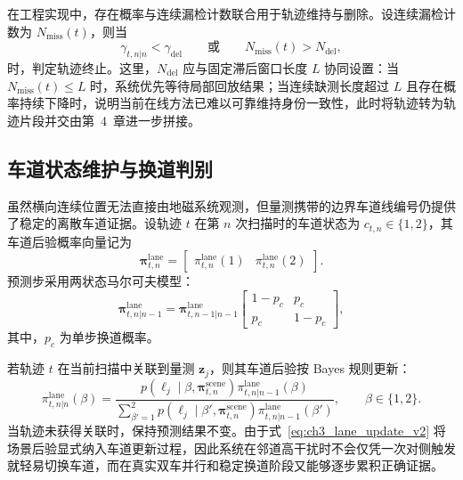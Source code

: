 \documentclass{xdupgthesis}
\begin{document}
在工程实现中，存在概率与连续漏检计数联合用于轨迹维持与删除。设连续漏检计数为 $N_{\mathrm{miss}}(t)$，则当
\begin{equation}
	\gamma_{t,n|n}<\gamma_{\mathrm{del}}
	\qquad\text{或}\qquad
	N_{\mathrm{miss}}(t)>N_{\mathrm{del}},
	\label{eq:ch3_delete_v2}
\end{equation}
时，判定轨迹终止。这里，$N_{\mathrm{del}}$ 应与固定滞后窗口长度 $L$ 协同设置：当 $N_{\mathrm{miss}}(t)\le L$ 时，系统优先等待局部回放结果；当连续缺测长度超过 $L$ 且存在概率持续下降时，说明当前在线方法已难以可靠维持身份一致性，此时将轨迹转为轨迹片段并交由第~4~章进一步拼接。

\subsection{车道状态维护与换道判别}

虽然横向连续位置无法直接由地磁系统观测，但量测携带的边界车道线编号仍提供了稳定的离散车道证据。设轨迹 $t$ 在第 $n$ 次扫描时的车道状态为 $c_{t,n}\in\{1,2\}$，其车道后验概率向量记为
\begin{equation}
	\boldsymbol\pi_{t,n}^{\mathrm{lane}}=
	\begin{bmatrix}
		\pi_{t,n}^{\mathrm{lane}}(1) &
		\pi_{t,n}^{\mathrm{lane}}(2)
	\end{bmatrix}.
	\label{eq:ch3_lane_vector_v2}
\end{equation}
预测步采用两状态马尔可夫模型：
\begin{equation}
	\boldsymbol\pi_{t,n|n-1}^{\mathrm{lane}}
	=
	\boldsymbol\pi_{t,n-1|n-1}^{\mathrm{lane}}
	\begin{bmatrix}
		1-p_c & p_c\\
		p_c & 1-p_c
	\end{bmatrix},
	\label{eq:ch3_lane_predict_v2}
\end{equation}
其中，$p_c$ 为单步换道概率。

若轨迹 $t$ 在当前扫描中关联到量测 $\mathbf z_j$，则其车道后验按 Bayes 规则更新：
\begin{equation}
	\pi_{t,n|n}^{\mathrm{lane}}(\beta)
	=
	\frac{p(\ell_j\mid \beta,\boldsymbol\pi_{t,n}^{\mathrm{scene}})\pi_{t,n|n-1}^{\mathrm{lane}}(\beta)}{\sum_{\beta'=1}^{2}p(\ell_j\mid \beta',\boldsymbol\pi_{t,n}^{\mathrm{scene}})\pi_{t,n|n-1}^{\mathrm{lane}}(\beta')},
	\qquad \beta\in\{1,2\}.
	\label{eq:ch3_lane_update_v2}
\end{equation}
当轨迹未获得关联时，保持预测结果不变。由于式~\eqref{eq:ch3_lane_update_v2} 将场景后验显式纳入车道更新过程，因此系统在邻道高干扰时不会仅凭一次对侧触发就轻易切换车道，而在真实双车并行和稳定换道阶段又能够逐步累积正确证据。
\end{document}
